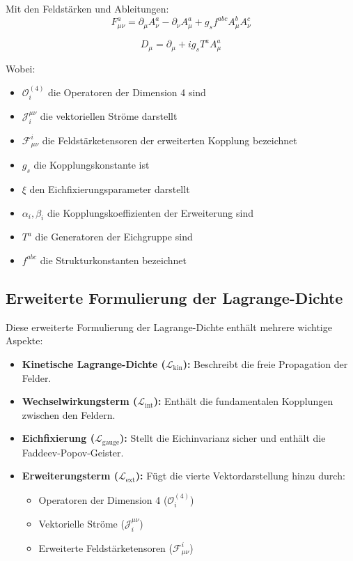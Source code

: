 \documentclass{article}
\begin{document}
Mit den Feldstärken und Ableitungen:
\begin{equation}
	F_{\mu\nu}^a = \partial_\mu A_\nu^a - \partial_\nu A_\mu^a + g_sf^{abc}A_\mu^b A_\nu^c
\end{equation}

\begin{equation}
	D_\mu = \partial_\mu + ig_sT^aA_\mu^a
\end{equation}

Wobei:
\begin{itemize}
	\item $\mathcal{O}_i^{(4)}$ die Operatoren der Dimension 4 sind
	\item $\mathcal{J}_i^{\mu\nu}$ die vektoriellen Ströme darstellt
	\item $\mathcal{F}_{\mu\nu}^i$ die Feldstärketensoren der erweiterten Kopplung bezeichnet
	\item $g_s$ die Kopplungskonstante ist
	\item $\xi$ den Eichfixierungsparameter darstellt
	\item $\alpha_i, \beta_i$ die Kopplungskoeffizienten der Erweiterung sind
	\item $T^a$ die Generatoren der Eichgruppe sind
	\item $f^{abc}$ die Strukturkonstanten bezeichnet
\end{itemize}

\subsection{Erweiterte Formulierung der Lagrange-Dichte}

Diese erweiterte Formulierung der Lagrange-Dichte enthält mehrere wichtige Aspekte:

\begin{itemize}
	\item \textbf{Kinetische Lagrange-Dichte ($\mathcal{L}_\text{kin}$):} Beschreibt die freie Propagation der Felder.
	\item \textbf{Wechselwirkungsterm ($\mathcal{L}_\text{int}$):} Enthält die fundamentalen Kopplungen zwischen den Feldern.
	\item \textbf{Eichfixierung ($\mathcal{L}_\text{gauge}$):} Stellt die Eichinvarianz sicher und enthält die Faddeev-Popov-Geister.
	\item \textbf{Erweiterungsterm ($\mathcal{L}_\text{ext}$):} Fügt die vierte Vektordarstellung hinzu durch:
	\begin{itemize}
		\item Operatoren der Dimension 4 ($\mathcal{O}_i^{(4)}$)
		\item Vektorielle Ströme ($\mathcal{J}_i^{\mu\nu}$)
		\item Erweiterte Feldstärketensoren ($\mathcal{F}_{\mu\nu}^i$)
	\end{itemize}
\end{itemize}
\end{document}
